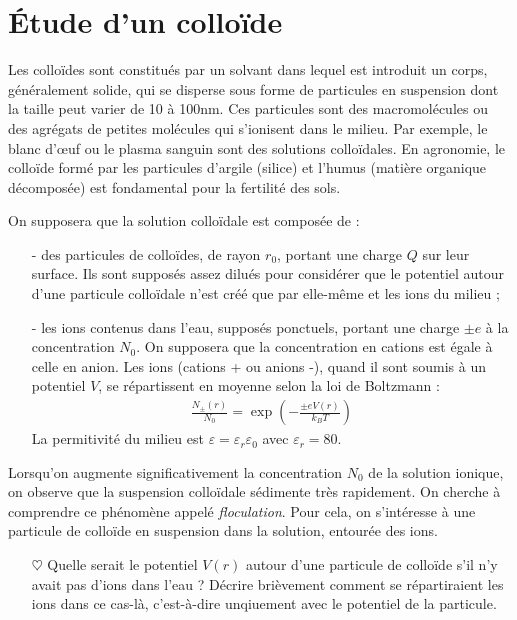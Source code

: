\documentclass{report}
\begin{document}
\newpage

\section*{Étude d'un colloïde}

Les colloïdes sont constitués par un solvant dans lequel est introduit un corps, généralement solide, qui se disperse sous forme de particules en suspension dont la taille peut varier de 10 à 100nm. Ces particules sont des macromolécules ou des agrégats de petites molécules qui s'ionisent dans le milieu. Par exemple, le blanc d'œuf ou le plasma sanguin sont des solutions colloïdales. En agronomie, le colloïde formé par les particules d'argile (silice) et l'humus (matière organique décomposée) est fondamental pour la fertilité des sols. 

On supposera que la solution colloïdale est composée de :
\begin{itemize}
	\item[-] des particules de colloïdes, de rayon $r_0$, portant une charge $Q$ sur leur surface. Ils sont supposés assez dilués pour considérer que le potentiel autour d'une particule colloïdale n'est créé que par elle-même et les ions du milieu ;
	
	\item[-] les ions contenus dans l'eau, supposés ponctuels, portant une charge $\pm e$ à la concentration $N_0$. On supposera que la concentration en cations est égale à celle en anion. Les ions (cations + ou anions -), quand il sont soumis à un potentiel $V$, se répartissent en moyenne selon la loi de Boltzmann :
\begin{align*}
	\frac{N_{\pm}(r)}{N_0}=\exp\left(-\frac{\pm eV(r)}{k_BT} \right) 
\end{align*}
La permitivité du milieu est $\varepsilon=\varepsilon_r\varepsilon_0$ avec $\varepsilon_r=80$.
\end{itemize}

Lorsqu'on augmente significativement la concentration $N_0$ de la solution ionique, on observe que la suspension colloïdale sédimente très rapidement. On cherche à comprendre ce phénomène appelé \textit{floculation}. Pour cela, on s'intéresse à une particule de colloïde en suspension dans la solution, entourée des ions. 

\begin{itemize}

	\item[$\heartsuit$] Quelle serait le potentiel $V(r)$ autour d'une particule de colloïde s'il n'y avait pas d'ions dans l'eau ? Décrire brièvement comment se répartiraient les ions dans ce cas-là, c'est-à-dire unqiuement avec le potentiel de la particule.

\end{itemize}
\end{document}
